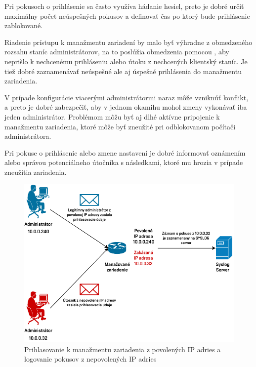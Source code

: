 Pri pokusoch o prihlásenie sa často využíva hádanie hesiel, preto je dobré určiť maximálny počet neúspešných pokusov a definovať čas po ktorý bude prihlásenie zablokované.

Riadenie prístupu k manažmentu zariadení by malo byť výhradne z obmedzeného rozsahu staníc administrátorov, na to poslúžia obmedzenia pomocou , aby neprišlo k nechcenému prihláseniu alebo útoku  z nechcených klientský staníc. Je tiež dobré zaznamenávať neúspešné ale aj úspešné prihlásenia do manažmentu zariadenia. 

V prípade konfigurácie viacerými administrátormi naraz môže vzniknúť konflikt, a preto je dobré zabezpečiť, aby v jednom okamihu mohol zmeny vykonávať iba jeden administrátor. Problémom môžu byť aj dlhé aktívne pripojenie k manažmentu zariadenia, ktoré môže byť zneužité pri odblokovanom počítači administrátora. 

Pri pokuse o prihlásenie alebo zmene nastavení je dobré informovať oznámením alebo správou potenciálneho útočníka s následkami, ktoré mu hrozia v prípade zneužitia zariadenia. 

\begin{figure}[H]
	\begin{center}
		\includegraphics[scale=1]{obrazky/login-log.pdf}
	\end{center}
	\caption[Prihlasovanie k manažmentu zariadenia z povolených IP adries a logovanie pokusov z nepovolených IP adries]{Prihlasovanie k manažmentu zariadenia z povolených IP adries a logovanie pokusov z nepovolených IP adries}
	\label{fig:login-log-mngmt}
\end{figure} 

